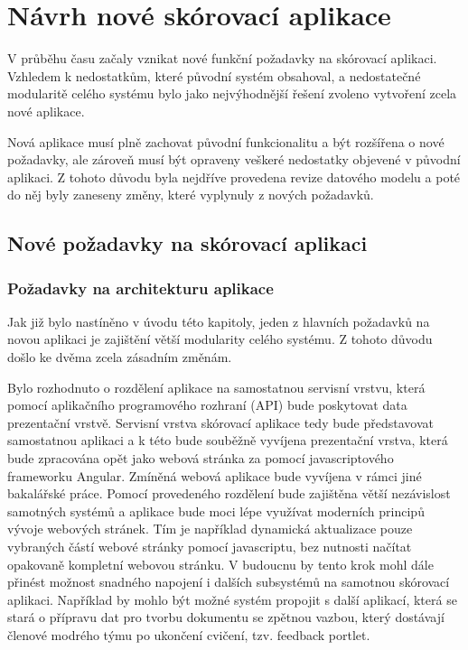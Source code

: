 \documentclass[
  digital, %
  twoside, %
  table,   %
  lof,     %
  lot,     %
]{fithesis3}
\begin{document}
\chapter{Návrh nové skórovací aplikace}
V průběhu času začaly vznikat nové funkční požadavky na skórovací aplikaci. Vzhledem k nedostatkům, které původní systém obsahoval, a nedostatečné modularitě celého systému bylo jako nejvýhodnější řešení zvoleno vytvoření zcela nové aplikace. 

Nová aplikace musí plně zachovat původní funkcionalitu a být rozšířena o nové požadavky, ale zároveň musí být opraveny veškeré nedostatky objevené v původní aplikaci. Z tohoto důvodu byla nejdříve provedena revize datového modelu a poté do něj byly zaneseny změny, které vyplynuly z nových požadavků. 

\section{Nové požadavky na skórovací aplikaci}
\subsection{Požadavky na architekturu aplikace}

Jak již bylo nastíněno v úvodu této kapitoly, jeden z hlavních požadavků na novou aplikaci je zajištění větší modularity celého systému. Z tohoto důvodu došlo ke dvěma zcela zásadním změnám.

Bylo rozhodnuto o rozdělení aplikace na samostatnou servisní vrstvu, která pomocí aplikačního programového rozhraní (API) bude poskytovat data prezentační vrstvě. Servisní vrstva skórovací aplikace tedy bude představovat samostatnou aplikaci a k této bude souběžně vyvíjena prezentační vrstva, která bude zpracována opět jako webová stránka za pomocí javascriptového frameworku Angular. Zmíněná webová aplikace bude vyvíjena v rámci jiné bakalářské práce. Pomocí provedeného rozdělení bude zajištěna větší nezávislost samotných systémů a aplikace bude moci lépe využívat moderních principů vývoje webových stránek. Tím je například dynamická aktualizace pouze vybraných částí webové stránky pomocí javascriptu, bez nutnosti načítat opakovaně kompletní webovou stránku. V budoucnu by tento krok mohl dále přinést možnost  snadného napojení i dalších subsystémů na samotnou skórovací aplikaci. Například by mohlo být možné systém propojit s další aplikací, která se stará o přípravu dat pro tvorbu dokumentu se zpětnou vazbou, který dostávají členové modrého týmu po ukončení cvičení, tzv. feedback portlet.
\end{document}
